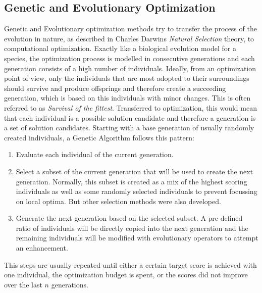 \subsection{Genetic and Evolutionary Optimization}
\label{sec:theory:optimization:genetic}
Genetic and Evolutionary optimization methods try to transfer the process of the evolution in nature, as described in Charles Darwins \textit{Natural Selection} theory, to computational optimization.
Exactly like a biological evolution model for a species, the optimization process is modelled in consecutive generations and each generation consists of a high number of individuals.
Ideally, from an optimization point of view, only the individuals that are most adopted to their surroundings should survive and produce offsprings and therefore create a succeeding generation, which is based on this individuals with minor changes.
This is often referred to as \textit{Survival of the fittest}.\newline
Transferred to optimization, this would mean that each individual is a possible solution candidate and therefore a generation is a set of solution candidates.
Starting with a base generation of usually randomly created individuals, a Genetic Algorithm follows this pattern:
\begin{enumerate}
    \item Evaluate each individual of the current generation.
    \item Select a subset of the current generation that will be used to create the next generation. Normally, this subset is created as a mix of the highest scoring individuals as well as some randomly selected individuals to prevent focussing on local optima. But other selection methods were also developed.
    \item Generate the next generation based on the selected subset. A pre-defined ratio of individuals will be directly copied into the next generation and the remaining individuals will be modified with evolutionary operators to attempt an enhancement.
\end{enumerate}
This steps are usually repeated until either a certain target score is achieved with one individual, the optimization budget is spent, or the scores did not improve over the last $n$ generations.

